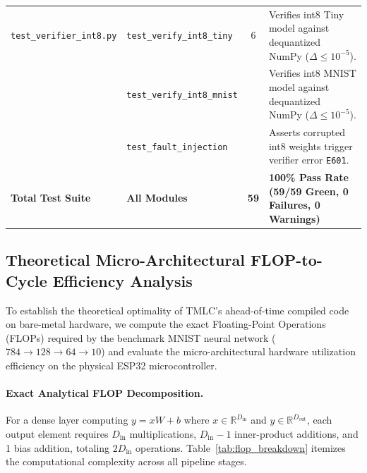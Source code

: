 \documentclass[11pt,a4paper]{article}
\begin{document}
\begin{table}[htbp]
\begin{tabular}{llcp{7.2cm}}
\midrule
\texttt{test\_verifier\_int8.py}& \texttt{test\_verify\_int8\_tiny} & 6 & Verifies int8 Tiny model against dequantized NumPy ($\Delta \le 10^{-5}$). \\
                                 & \texttt{test\_verify\_int8\_mnist}& & Verifies int8 MNIST model against dequantized NumPy ($\Delta \le 10^{-5}$). \\
                                 & \texttt{test\_fault\_injection}   & & Asserts corrupted int8 weights trigger verifier error \texttt{E601}. \\
\midrule
\textbf{Total Test Suite} & \textbf{All Modules} & \textbf{59} & \textbf{100\% Pass Rate (59/59 Green, 0 Failures, 0 Warnings)} \\
\bottomrule
\end{tabular}
\end{table}


\subsection{Theoretical Micro-Architectural FLOP-to-Cycle Efficiency Analysis}
\label{sec:flop_efficiency}

To establish the theoretical optimality of TMLC's ahead-of-time compiled code on bare-metal hardware, we compute the exact Floating-Point Operations (FLOPs) required by the benchmark MNIST neural network ($784 \to 128 \to 64 \to 10$) and evaluate the micro-architectural hardware utilization efficiency on the physical ESP32 microcontroller.

\paragraph{Exact Analytical FLOP Decomposition.}
For a dense layer computing $y = x W + b$ where $x \in \mathbb{R}^{D_{\text{in}}}$ and $y \in \mathbb{R}^{D_{\text{out}}}$, each output element requires $D_{\text{in}}$ multiplications, $D_{\text{in}} - 1$ inner-product additions, and 1 bias addition, totaling $2 D_{\text{in}}$ operations. Table~\ref{tab:flop_breakdown} itemizes the computational complexity across all pipeline stages.
\end{document}
